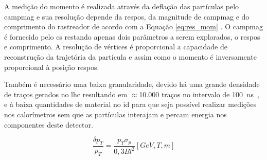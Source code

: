 A medição do momento é realizada através da deflação das partículas pelo
\gls{campmag} e sua resolução depende da \gls{respos}, da magnitude de
\gls{campmag} e do \gls{comprimento} do rastreador de acordo com a Equação \ref{eq:res_mom}
\cite{lecture_slides_1,lecture_slides_2}. O \gls{campmag} é fornecido pelo
\gls{cs} restando apenas dois parâmetros a serem explorados, o \gls{respos} e \gls{comprimento}. 
A resolução de vértices é proporcional a capacidade de reconstrução da trajetória da partícula e 
assim como o momento é inversamente proporcional à posição \gls{respos}. 

Também é necessário uma baixa granularidade, devido há uma grande densidade de
traços gerados no \gls{lhc} resultando em $\approx$10.000 traços no intervalo de 
100~$n$s~\cite{resumo_ATLAS}, e à baixa quantidades de material no \gls{id} 
para que seja possível realizar medições nos calorímetros sem que as partículas 
interajam e percam energia nos componentes deste detector.

\begin{equation}\label{eq:res_mom}
\frac{\delta p_T}{p_T} = \frac{p_T \sigma_p}{0,3Bl^2} [GeV,T,m]
\end{equation}

